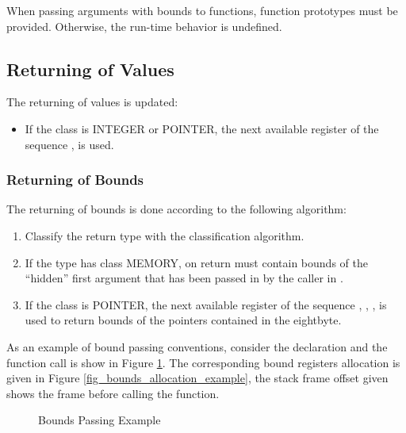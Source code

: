 When passing arguments with bounds to functions, function prototypes must
be provided.  Otherwise, the run-time behavior is undefined.

\subsection{Returning of Values}

The returning of values is updated:

\begin{itemize}
\item If the class is INTEGER or POINTER, the next available register
   of the sequence \RAX, \RDX is used.
\end{itemize}

\subsubsection{Returning of Bounds}
The returning of bounds is done according to the following algorithm:
\begin{enumerate}
\item Classify the return type with the classification algorithm.

\item If the type has class MEMORY, on return  must contain
  bounds of the ``hidden'' first argument that has been passed in by
  the caller in \RDI.

\item If the class is POINTER, the next available register of the sequence
  , , ,  is used to return bounds
  of the pointers contained in the eightbyte.
\end{enumerate}

As an example of bound passing conventions, consider the declaration
and the function call is show in Figure \ref{fig_bounds_passing_example}.
The corresponding bound registers allocation is given in
Figure \ref{fig_bounds_allocation_example}, the stack frame offset given
shows the frame before calling the function.

\begin{figure}[H]
\Hrule
\caption{Bounds Passing Example}
\label{fig_bounds_passing_example}
\begin{center}
\end{center}
\Hrule
\end{figure}

